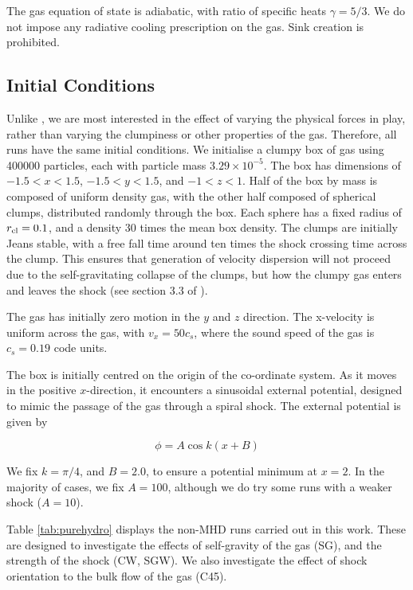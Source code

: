 \documentclass[a4paper,fleqn,usenatbib]{mnras}
\begin{document}
The gas equation of state is adiabatic, with ratio of specific heats $\gamma=5/3$.  We do not impose any radiative cooling prescription on the gas.  Sink creation is prohibited.  

\subsection{Initial Conditions}

\noindent Unlike \citet{Dobbs2007}, we are most interested in the effect of varying the physical forces in play, rather than varying the clumpiness or other properties of the gas.  Therefore, all runs have the same initial conditions.  We initialise a clumpy box of gas using 400000 particles, each with particle mass $3.29\times10^{-5}$.  The box has dimensions of $-1.5 < x < 1.5$, $-1.5 < y < 1.5$, and $-1 < z < 1$.  Half of the box by mass is composed of uniform density gas, with the other half composed of spherical clumps, distributed randomly through the box.  Each sphere has a fixed radius of $r_{\rm cl} = 0.1$, and a density 30 times the mean box density.  The clumps are initially Jeans stable, with a free fall time around ten times the shock crossing time across the clump.  This ensures that generation of velocity dispersion will not proceed due to the self-gravitating collapse of the clumps, but how the clumpy gas enters and leaves the shock (see section 3.3 of \citealt{Dobbs2007}).

The gas has initially zero motion in the $y$ and $z$ direction.  The x-velocity is uniform across the gas, with $v_x=50 c_s$, where the sound speed of the gas is $c_s=0.19$ code units.

The box is initially centred on the origin of the co-ordinate system.  As it moves in the positive $x$-direction, it encounters a sinusoidal external potential, designed to mimic the passage of the gas through a spiral shock.  The external potential is given by 

\begin{equation}
\phi = A \cos k \left(x + B\right)
\end{equation}

\noindent We fix $k=\pi/4$, and $B=2.0$, to ensure a potential minimum at $x=2$.  In the majority of cases, we fix $A=100$, although we do try some runs with a weaker shock ($A=10$).

Table \ref{tab:purehydro} displays the non-MHD runs carried out in this work.  These are designed to investigate the effects of self-gravity of the gas (SG), and the strength of the shock (CW, SGW).  We also investigate the effect of shock orientation to the bulk flow of the gas (C45).
\end{document}
